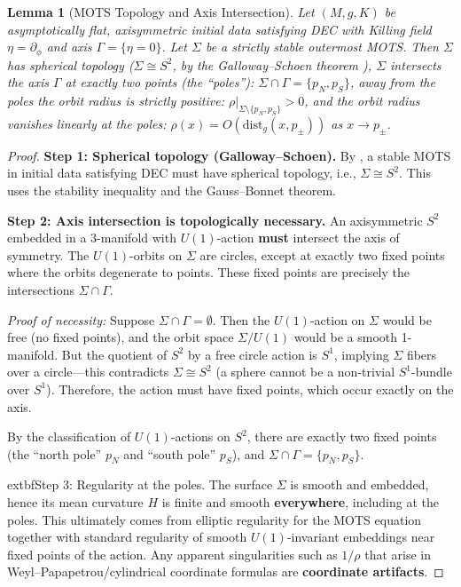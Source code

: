 \documentclass[12pt]{article}
\theoremstyle{plain}
\newtheorem{lemma}[theorem]{Lemma}
\theoremstyle{definition}
\theoremstyle{remark}
\begin{document}
\begin{lemma}[MOTS Topology and Axis Intersection]\label{lem:mots-axis}
Let $(M, g, K)$ be asymptotically flat, axisymmetric initial data satisfying DEC with Killing field $\eta = \partial_\phi$ and axis $\Gamma = \{\eta = 0\}$. Let $\Sigma$ be a strictly stable outermost MOTS. Then $\Sigma$ has spherical topology ($\Sigma \cong S^2$, by the Galloway--Schoen theorem \cite{gallowayschoen2006}), $\Sigma$ intersects the axis $\Gamma$ at exactly two points (the ``poles''): $\Sigma \cap \Gamma = \{p_N, p_S\}$, away from the poles the orbit radius is strictly positive: $\rho|_{\Sigma \setminus \{p_N, p_S\}} > 0$, and the orbit radius vanishes linearly at the poles: $\rho(x) = O(\mathrm{dist}_g(x, p_\pm))$ as $x \to p_\pm$.
\end{lemma}

\begin{proof}
\textbf{Step 1: Spherical topology (Galloway--Schoen).} By \cite[Theorem 1]{gallowayschoen2006}, a stable MOTS in initial data satisfying DEC must have spherical topology, i.e., $\Sigma \cong S^2$. This uses the stability inequality and the Gauss--Bonnet theorem.

\textbf{Step 2: Axis intersection is topologically necessary.}
An axisymmetric $S^2$ embedded in a 3-manifold with $U(1)$-action \textbf{must} intersect the axis of symmetry. The $U(1)$-orbits on $\Sigma$ are circles, except at exactly two fixed points where the orbits degenerate to points. These fixed points are precisely the intersections $\Sigma \cap \Gamma$.

\textit{Proof of necessity:} Suppose $\Sigma \cap \Gamma = \emptyset$. Then the $U(1)$-action on $\Sigma$ would be free (no fixed points), and the orbit space $\Sigma/U(1)$ would be a smooth 1-manifold. But the quotient of $S^2$ by a free circle action is $S^1$, implying $\Sigma$ fibers over a circle---this contradicts $\Sigma \cong S^2$ (a sphere cannot be a non-trivial $S^1$-bundle over $S^1$). Therefore, the action must have fixed points, which occur exactly on the axis.

By the classification of $U(1)$-actions on $S^2$, there are exactly two fixed points (the ``north pole'' $p_N$ and ``south pole'' $p_S$), and $\Sigma \cap \Gamma = \{p_N, p_S\}$.

	extbf{Step 3: Regularity at the poles.}
The surface $\Sigma$ is smooth and embedded, hence its mean curvature $H$ is finite and smooth \textbf{everywhere}, including at the poles. This ultimately comes from elliptic regularity for the MOTS equation together with standard regularity of smooth $U(1)$-invariant embeddings near fixed points of the action. Any apparent singularities such as $1/\rho$ that arise in Weyl--Papapetrou/cylindrical coordinate formulas are \textbf{coordinate artifacts}.


\end{proof}
\end{document}
